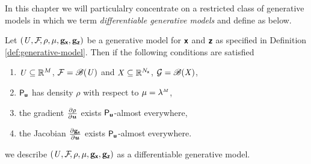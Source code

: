 
In this chapter we will particulalry concentrate on a restricted class of generative models in which we term \emph{differentiable generative models} and define as below.

\begin{definition}\label{def:differentiable-generative-model}
Let $(\mathit{U},\mathcal{F}\kern-2pt,\rho,\mu,{\mathbf{g}}_{\boldsymbol{\mathsf{x}}},{\mathbf{g}}_{\boldsymbol{\mathsf{z}}})$ be a generative model for $\boldsymbol{\mathsf{x}}$ and $\boldsymbol{\mathsf{z}}$ as specified in Definition \ref{def:generative-model}. Then if the following conditions are satisfied
\begin{enumerate}
\item
$\mathit{U} \subseteq \mathbb{R}^M$, $\mathcal{F} = \mathscr{B}(\mathit{U})$ and $\mathit{X} \subseteq \mathbb{R}^{N_{\boldsymbol{\mathsf{x}}}}$, $\mathcal{G} = \mathscr{B}(\mathit{X})$, %
\item
$\mathsf{P}_{\boldsymbol{\mathsf{u}}}$ has density $\rho$ with respect to $\mu = \lebm{M}$, 
\item
the gradient $\frac{\partial \rho}{\partial \boldsymbol{u}}$ exists $\mathsf{P}_{\boldsymbol{\mathsf{u}}}$-almost everywhere, 
\item
the Jacobian $\frac{\partial {\mathbf{g}}_{\boldsymbol{\mathsf{x}}}}{\partial \boldsymbol{u}}$ exists $\mathsf{P}_{\boldsymbol{\mathsf{u}}}$-almost everywhere.
\end{enumerate}
we describe $(\mathit{U},\mathcal{F}\kern-2pt,\rho,\mu,{\mathbf{g}}_{\boldsymbol{\mathsf{x}}},{\mathbf{g}}_{\boldsymbol{\mathsf{z}}})$ as a differentiable generative model.
\end{definition}


